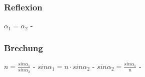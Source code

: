 \subsubsection{Reflexion} 
\begin{minipage}{0.45\textwidth} 
\end{minipage} 
\begin{minipage}{0.45\textwidth} 
 
\legende{}\end{minipage} 
 
$ \alpha _{1}  = \alpha _{2} $ - \\ 
 
\subsubsection{Brechung} 
\begin{minipage}{0.45\textwidth} 
\end{minipage} 
\begin{minipage}{0.45\textwidth} 
 
\legende{}\end{minipage} 
 
$ n = \frac{sin\alpha _{1} }{sin\alpha _{2} } $ - $ sin\alpha _{1}  = n\cdot sin\alpha _{2} $ - $ sin\alpha _{2}  = \frac{sin\alpha _{1} }{ n} $ - \\ 
 
